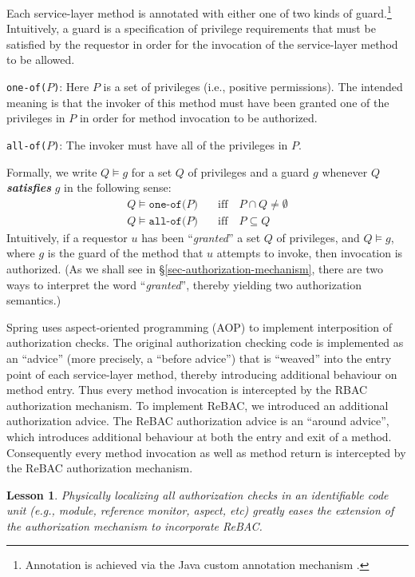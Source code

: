 \documentclass{acm_proc_article-sp}
\newcommand{\Dfn}[1]{\textbf{\emph{#1}}}
\newcommand{\textcode}[1]{\texttt{#1}}
\newtheorem{lesson}{Lesson}
\begin{document}
Each service-layer method is annotated with either one of two kinds of
guard.\footnote{Annotation is achieved via the Java custom annotation
  mechanism \cite[\S 9.7]{JavaLangSpec}.}  Intuitively, a guard is a
specification of privilege requirements that must be satisfied by the
requestor in order for the invocation of the service-layer method to
be allowed.
\begin{compactenum}
\item \textcode{one-of($P$)}: Here $P$ is a set of privileges (i.e., 
 positive permissions). The intended meaning is that the invoker of
 this method must have been granted one of the privileges in $P$
 in order for method invocation to be authorized.
\item \textcode{all-of($P$)}: The invoker must have all of the
  privileges in $P$.
\end{compactenum}
Formally, we write $Q \models g$ for a set $Q$ of privileges and a
guard $g$ whenever $Q$ \Dfn{satisfies} $g$ in the following sense:
\begin{align*}
Q \models \textcode{one-of(}P\textcode{)} & 
  \quad\text{iff}\quad P\cap Q \neq \emptyset \\
Q \models \textcode{all-of(}P\textcode{)} &
 \quad\text{iff}\quad P \subseteq Q 
\end{align*}
Intuitively, if a requestor $u$ has been ``\emph{granted}'' a set $Q$
of privileges, and $Q \models g$, where $g$ is the guard of the method
that $u$ attempts to invoke, then invocation is authorized.  (As we
shall see in \S \ref{sec-authorization-mechanism}, there are two ways
to interpret the word ``\emph{granted}'', thereby yielding two
authorization semantics.)


Spring uses aspect-oriented programming (AOP)
\cite{Kiczales-etal:1997} to implement interposition of authorization
checks.  The original authorization checking code is implemented as an
``advice'' (more precisely, a ``before advice'') that is ``weaved''
into the entry point of each service-layer method, thereby introducing
additional behaviour on method entry.  Thus every method invocation is
intercepted by the RBAC authorization mechanism.  To implement ReBAC,
we introduced an additional authorization advice.  The ReBAC
authorization advice is an ``around advice'', which introduces
additional behaviour at both the entry and exit of a method.
Consequently every method invocation as well as method return is
intercepted by the ReBAC authorization mechanism.

\begin{lesson}
  Physically localizing all authorization checks in an identifiable
  code unit (e.g., module, reference monitor, aspect, etc) greatly
  eases the extension of the authorization mechanism to incorporate
  ReBAC.
\end{lesson}
\end{document}
